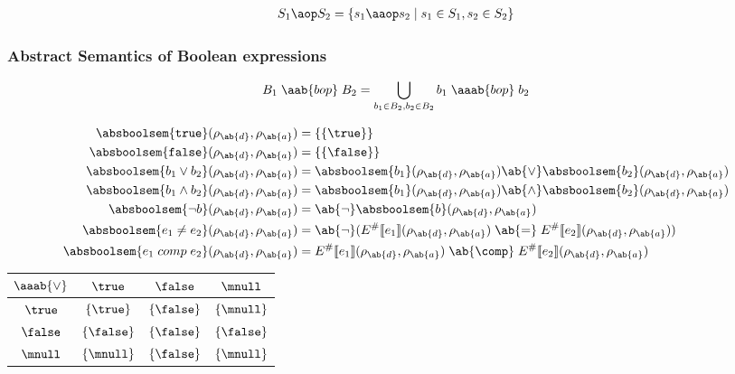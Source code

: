 \begin{align}
    S_1 \aop S_2 = \{ s_1 \aaop s_2 \mid s_1 \in S_1, s_2 \in S_2 \}
\end{align}

\subsubsection{Abstract Semantics of Boolean expressions}

\begin{align}
    B_1 \;\aab{bop}\; B_2 = \bigcup_{b_1 \in B_2, b_2 \in B_2} b_1 \;\aaab{bop}\; b_2
\end{align}

\begin{align}
    \absboolsem{\texttt{true}}(\rho_{\ab{d}}, \rho_{\ab{a}}) &= \{\{\true\}\} \\
    \absboolsem{\texttt{false}}(\rho_{\ab{d}}, \rho_{\ab{a}}) &= \{\{\false\}\} \\
    \absboolsem{b_1 \lor b_2}(\rho_{\ab{d}}, \rho_{\ab{a}}) &= \absboolsem{b_1}(\rho_{\ab{d}}, \rho_{\ab{a}}) \ab{\lor} \absboolsem{b_2}(\rho_{\ab{d}}, \rho_{\ab{a}}) \\
    \absboolsem{b_1 \land b_2}(\rho_{\ab{d}}, \rho_{\ab{a}}) &= \absboolsem{b_1}(\rho_{\ab{d}}, \rho_{\ab{a}}) \ab{\land} \absboolsem{b_2}(\rho_{\ab{d}}, \rho_{\ab{a}}) \\
    \absboolsem{\neg b}(\rho_{\ab{d}}, \rho_{\ab{a}}) &= \ab{\neg} \absboolsem{b}(\rho_{\ab{d}}, \rho_{\ab{a}}) \\
    \absboolsem{e_1 \neq e_2}(\rho_{\ab{d}}, \rho_{\ab{a}}) &= \ab{\neg}(\absexpsem{e_1}(\rho_{\ab{d}}, \rho_{\ab{a}}) \;\ab{=}\; \absexpsem{e_2}(\rho_{\ab{d}}, \rho_{\ab{a}})) \\
    \absboolsem{e_1 \;comp\; e_2}(\rho_{\ab{d}}, \rho_{\ab{a}}) &= \absexpsem{e_1}(\rho_{\ab{d}}, \rho_{\ab{a}}) \;\ab{\comp}\; \absexpsem{e_2}(\rho_{\ab{d}}, \rho_{\ab{a}}) \\
\end{align}

\begin{table}[H]
    \centering
    \begin{tabular}{c|ccc}
        $\aaab{\lor}$ & $\true$ & $\false$ & $\mnull$ \\
        \hline
        $\true$ & $\{\true\}$ & $\{\false\}$ & $\{\mnull\}$ \\
        $\false$ & $\{\false\}$ & $\{\false\}$ & $\{\false\}$ \\
        $\mnull$ & $\{\mnull\}$ & $\{\false\}$ & $\{\mnull\}$ \\
    \end{tabular}
    \label{tab:aaablor}
\end{table}


